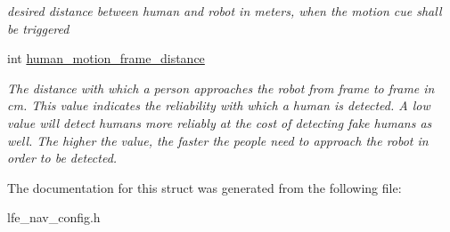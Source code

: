 \begin{DoxyCompactItemize}
\begin{DoxyCompactList}\small\item\em desired distance between human and robot in meters, when the motion cue shall be triggered \end{DoxyCompactList}\item 
int \hyperlink{structlfe__navigation_1_1LfeNavConfig_1_1HumanRobotInteraction_af3381ffca42b000ad046afcef4637341}{human\+\_\+motion\+\_\+frame\+\_\+distance}\hypertarget{structlfe__navigation_1_1LfeNavConfig_1_1HumanRobotInteraction_af3381ffca42b000ad046afcef4637341}{}\label{structlfe__navigation_1_1LfeNavConfig_1_1HumanRobotInteraction_af3381ffca42b000ad046afcef4637341}

\begin{DoxyCompactList}\small\item\em The distance with which a person approaches the robot from frame to frame in cm. This value indicates the reliability with which a human is detected. A low value will detect humans more reliably at the cost of detecting \textquotesingle{}fake\textquotesingle{} humans as well. The higher the value, the faster the people need to approach the robot in order to be detected. \end{DoxyCompactList}\end{DoxyCompactItemize}


The documentation for this struct was generated from the following file\+:\begin{DoxyCompactItemize}
\item 
lfe\+\_\+nav\+\_\+config.\+h\end{DoxyCompactItemize}
